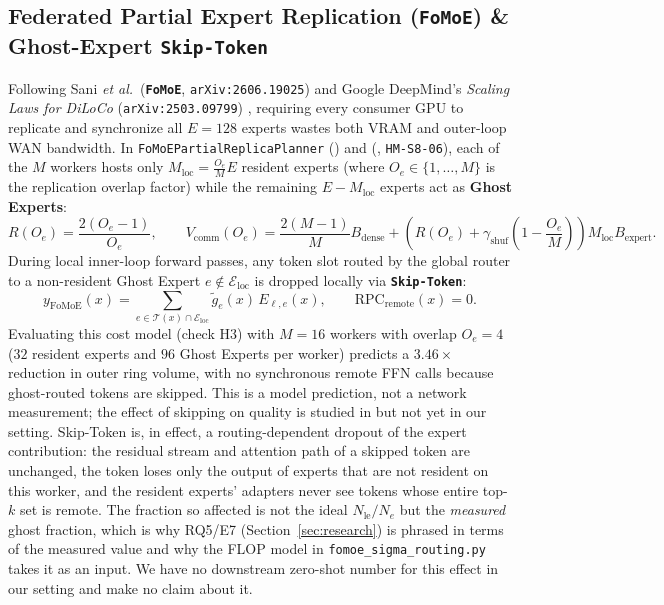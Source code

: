 \documentclass[11pt,a4paper]{article}
\begin{document}
\subsection{Federated Partial Expert Replication (\texttt{FoMoE}) \& Ghost-Expert \texttt{Skip-Token}}

Following Sani \textit{et al.}\ (\textbf{\texttt{FoMoE}}, \texttt{arXiv:2606.19025}) \cite{sani2026fomoe} and Google DeepMind's \textit{Scaling Laws for DiLoCo} (\texttt{arXiv:2503.09799}) \cite{charles2025scalingdiloco}, requiring every consumer GPU to replicate and synchronize all $E=128$ experts wastes both VRAM and outer-loop WAN bandwidth. In \texttt{FoMoEPartialReplicaPlanner} () and  (, \texttt{HM-S8-06}), each of the $M$ workers hosts only $M_{\text{loc}} = \frac{O_e}{M} E$ resident experts (where $O_e \in \{1, \dots, M\}$ is the replication overlap factor) while the remaining $E - M_{\text{loc}}$ experts act as \textbf{Ghost Experts}:
\begin{equation}
    R(O_e) = \frac{2(O_e - 1)}{O_e}, \qquad V_{\text{comm}}(O_e) = \frac{2(M-1)}{M} B_{\text{dense}} + \left(R(O_e) + \gamma_{\text{shuf}}\left(1 - \frac{O_e}{M}\right)\right) M_{\text{loc}} B_{\text{expert}}.
\end{equation}
During local inner-loop forward passes, any token slot routed by the global router to a non-resident Ghost Expert $e \notin \mathcal{E}_{\text{loc}}$ is dropped locally via \textbf{\texttt{Skip-Token}}:
\begin{equation}
    y_{\text{FoMoE}}(x) = \sum_{e \in \mathcal{T}(x) \cap \mathcal{E}_{\text{loc}}} \tilde{g}_e(x) \, E_{\ell, e}(x), \qquad \text{RPC}_{\text{remote}}(x) = 0.
\end{equation}
Evaluating this cost model (check H3) with $M=16$ workers with overlap $O_e = 4$ ($32$ resident experts and $96$ Ghost Experts per worker) predicts a $3.46\times$ reduction in outer ring volume, with no synchronous remote FFN calls because ghost-routed tokens are skipped. This is a model prediction, not a network measurement; the effect of skipping on quality is studied in \cite{sani2026fomoe} but not yet in our setting. Skip-Token is, in effect, a routing-dependent dropout of the expert contribution: the residual stream and attention path of a skipped token are unchanged, the token loses only the output of experts that are not resident on this worker, and the resident experts' adapters never see tokens whose entire top-$k$ set is remote. The fraction so affected is not the ideal $N_{\text{le}}/N_e$ but the \emph{measured} ghost fraction, which is why RQ5/E7 (Section~\ref{sec:research}) is phrased in terms of the measured value and why the FLOP model in \texttt{fomoe\_sigma\_routing.py} takes it as an input. We have no downstream zero-shot number for this effect in our setting and make no claim about it.
\end{document}
